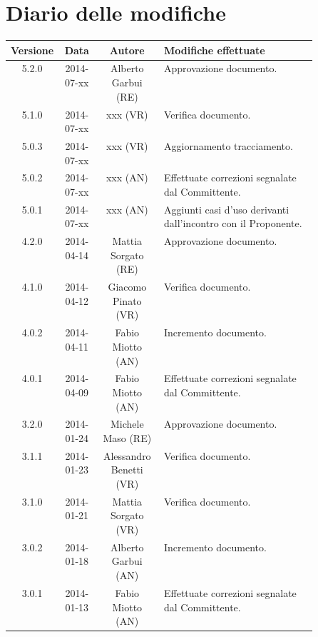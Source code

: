 
\newpage
\section{Diario delle modifiche}
\begin{center}
\begin{longtable}{|c|c|c|p{0.5\linewidth}|}
\toprule
\textbf{Versione} & \textbf{Data} & \textbf{Autore} & \textbf{Modifiche effettuate}\\

\midrule
5.2.0 & 2014-07-xx & Alberto Garbui (RE) & Approvazione documento.\\
\midrule
5.1.0 & 2014-07-xx & xxx (VR) & Verifica documento.\\

\midrule
5.0.3 & 2014-07-xx & xxx (VR) & Aggiornamento tracciamento.\\

\midrule
5.0.2 & 2014-07-xx & xxx (AN) & Effettuate correzioni segnalate dal Committente.\\
\midrule
5.0.1 & 2014-07-xx & xxx (AN) & Aggiunti casi d'uso derivanti dall'incontro con il Proponente.\\

\midrule
4.2.0 & 2014-04-14 & Mattia Sorgato (RE) & Approvazione documento.\\
\midrule
4.1.0 & 2014-04-12 & Giacomo Pinato (VR) & Verifica documento.\\
\midrule
4.0.2 & 2014-04-11 &  Fabio Miotto (AN) & Incremento documento.\\
\midrule
4.0.1 & 2014-04-09 &  Fabio Miotto (AN) & Effettuate correzioni segnalate dal Committente.\\

\midrule
3.2.0 & 2014-01-24 & Michele Maso (RE) & Approvazione documento.\\
\midrule
3.1.1 & 2014-01-23 & Alessandro Benetti (VR) & Verifica documento.\\
\midrule
3.1.0 & 2014-01-21 & Mattia Sorgato (VR) & Verifica documento.\\
\midrule
3.0.2 & 2014-01-18 & Alberto Garbui (AN) & Incremento documento.\\
\midrule
3.0.1 & 2014-01-13 & Fabio Miotto (AN) & Effettuate correzioni segnalate dal Committente.\\


\end{longtable}
\end{center}
